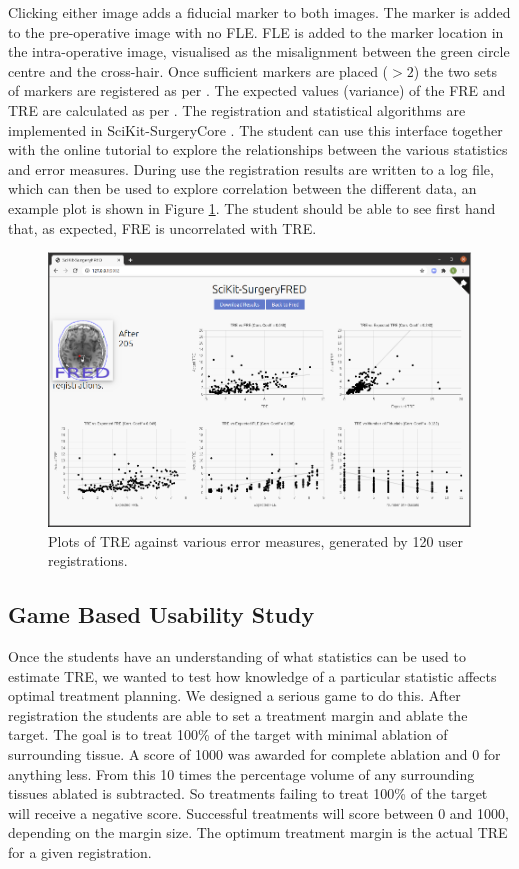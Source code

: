 Clicking either image adds a fiducial marker to both images. The marker is added to the pre-operative image with no \gls{FLE}. \gls{FLE} is added to the marker location in the intra-operative image, visualised as the misalignment between the green circle centre and the cross-hair. Once sufficient markers are placed ($>2$) the two sets of markers are registered as per \cite{Arun1987}. The expected values (variance) of the \gls{FRE} and \gls{TRE} are calculated 
as per \cite{Fitzpatrick1998}. The registration and statistical algorithms are implemented in SciKit-SurgeryCore \cite{matt_clarkson_2020_3965731}. The student can use this interface together with the
online tutorial 
to explore the relationships between the various statistics and error measures. During use the registration results are 
written to a log file, which can then be used to explore correlation between the different data, an example plot is shown in Figure \ref{fig:correlation}. 
The student should be able to see first hand that, as expected, \gls{FRE} is uncorrelated with \gls{TRE}.

\begin{figure}
	\begin{center}
	\includegraphics[width=0.9\linewidth]{images/default.eps}
		\caption{\label{fig:correlation}Plots of TRE against various error measures, generated by 
		120 user registrations.}
	\end{center}
\end{figure}

\subsection{Game Based Usability Study}
Once the students have an understanding of what statistics can be used to estimate \gls{TRE}, we wanted to test 
how knowledge of a particular statistic affects optimal treatment planning. We designed a serious game to 
do this. After registration the students are able to set a treatment margin and ablate the target. The goal is 
to treat 100\% of the target with minimal ablation of surrounding tissue. A score of 1000 was awarded for complete ablation and 0 
for anything less. From this 10 times the percentage volume of any surrounding tissues ablated is subtracted. So 
treatments failing to treat 100\% of the target will receive a negative score. 
Successful treatments will score between 0 and 1000, depending on the margin size. The optimum treatment 
margin is the actual \gls{TRE} for a given registration.


